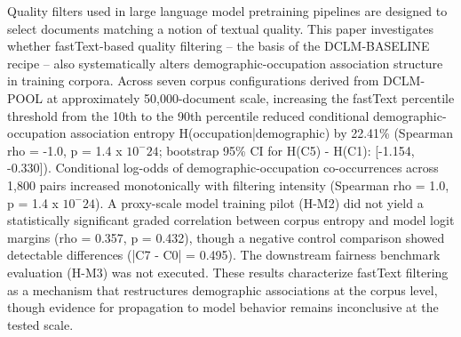 
Quality filters used in large language model pretraining pipelines are designed to select documents matching a notion of textual quality. This paper investigates whether fastText-based quality filtering -- the basis of the DCLM-BASELINE recipe -- also systematically alters demographic-occupation association structure in training corpora. Across seven corpus configurations derived from DCLM-POOL at approximately 50,000-document scale, increasing the fastText percentile threshold from the 10th to the 90th percentile reduced conditional demographic-occupation association entropy H(occupation|demographic) by 22.41\% (Spearman rho = -1.0, p = 1.4 x $10^-24$; bootstrap 95\% CI for H(C5) - H(C1): [-1.154, -0.330]). Conditional log-odds of demographic-occupation co-occurrences across 1,800 pairs increased monotonically with filtering intensity (Spearman rho = 1.0, p = 1.4 x $10^-24$). A proxy-scale model training pilot (H-M2) did not yield a statistically significant graded correlation between corpus entropy and model logit margins (rho = 0.357, p = 0.432), though a negative control comparison showed detectable differences (|C7 - C0| = 0.495). The downstream fairness benchmark evaluation (H-M3) was not executed. These results characterize fastText filtering as a mechanism that restructures demographic associations at the corpus level, though evidence for propagation to model behavior remains inconclusive at the tested scale.

